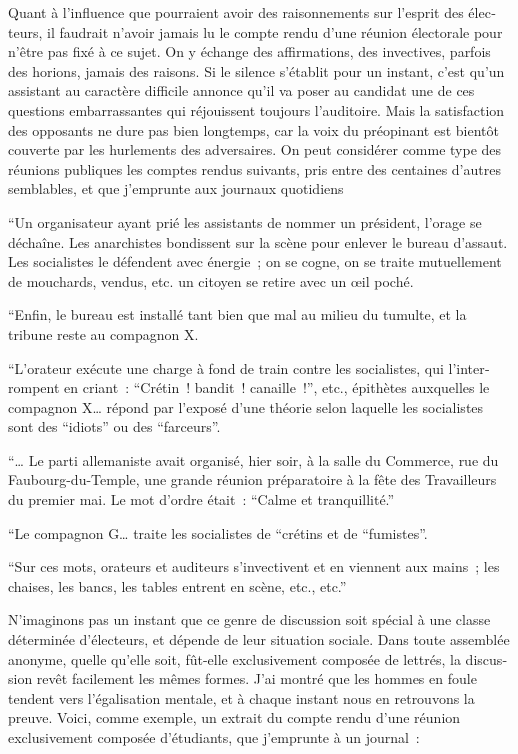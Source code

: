 \documentclass[french,twoside]{book} %
\begin{document}
Quant à l’influence que pourraient avoir des raisonnements sur l’esprit des élec­teurs, il faudrait n’avoir jamais lu le compte rendu d’une réunion électorale pour n’être pas fixé à ce sujet. On y échange des affirmations, des invectives, parfois des horions, jamais des raisons. Si le silence s’établit pour un instant, c’est qu’un assistant au caractère difficile annonce qu’il va poser au candidat une de ces questions embar­rassantes qui réjouissent toujours l’auditoire. Mais la satisfaction des opposants ne dure pas bien longtemps, car la voix du préopinant est bientôt couverte par les hurlements des adversaires. On peut considérer comme type des réunions publiques les comptes rendus suivants, pris entre des centaines d’autres semblables, et que j’emprunte aux journaux quotidiens\par
“Un organisateur ayant prié les assistants de nommer un président, l’orage se déchaîne. Les anarchistes bon­dissent sur la scène pour enlever le bureau d’assaut. Les socialistes le défendent avec énergie ; on se cogne, on se traite mutuellement de mouchards, vendus, etc. un citoyen se retire avec un œil poché.\par
“Enfin, le bureau est installé tant bien que mal au milieu du tumulte, et la tribune reste au compagnon X.\par
“L’orateur exécute une charge à fond de train contre les socialistes, qui l’inter­rompent en criant : “Crétin ! bandit ! canaille !”, etc., épithètes auxquelles le compa­gnon X… répond par l’exposé d’une théorie selon laquelle les socialistes sont des “idiots” ou des “farceurs”.\par
“… Le parti allemaniste avait organisé, hier soir, à la salle du Commerce, rue du Faubourg-du-Temple, une grande réunion préparatoire à la fête des Travailleurs du premier mai. Le mot d’ordre était : “Calme et tranquillité.”\par
“Le compagnon G… traite les socialistes de “crétins et de “fumistes”.\par
“Sur ces mots, orateurs et auditeurs s’invectivent et en viennent aux mains ; les chaises, les bancs, les tables entrent en scène, etc., etc.”\par
N’imaginons pas un instant que ce genre de discussion soit spécial à une classe déterminée d’électeurs, et dépende de leur situation sociale. Dans toute assemblée anonyme, quelle qu’elle soit, fût-elle exclusivement composée de lettrés, la discus­sion revêt facilement les mêmes formes. J’ai montré que les hommes en foule tendent vers l’égalisation mentale, et à chaque instant nous en retrouvons la preuve. Voici, comme exemple, un extrait du compte rendu d’une réunion exclusivement composée d’étudiants, que j’emprunte à un journal :\par
\end{document}
